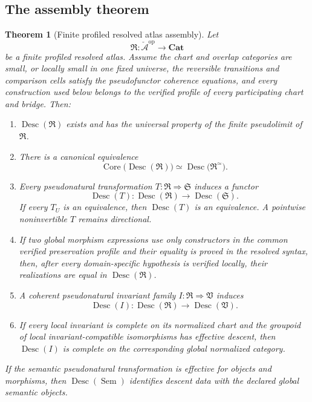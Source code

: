 \documentclass[11pt]{article}
\newtheorem{theorem}{Theorem}[section]
\theoremstyle{definition}
\theoremstyle{remark}
\DeclareMathOperator{\Desc}{Desc}
\DeclareMathOperator{\Core}{Core}
\DeclareMathOperator{\Sem}{Sem}
\newcommand{\Cat}{\mathbf{Cat}}
\begin{document}
\subsection{The assembly theorem}

\begin{theorem}[Finite profiled resolved atlas assembly]
\label{thm:atlas-assembly}
Let
\[
\mathfrak R:\check{\mathcal A}^{\mathrm{op}}\to\Cat
\]
be a finite profiled resolved atlas. Assume the chart and overlap categories are small, or locally small in one fixed universe, the reversible transitions and comparison cells satisfy the pseudofunctor coherence equations, and every construction used below belongs to the verified profile of every participating chart and bridge. Then:

\begin{enumerate}[label=\textup{(\roman*)}]
\item \(\Desc(\mathfrak R)\) exists and has the universal property of the finite pseudolimit of \(\mathfrak R\).
\item There is a canonical equivalence
\[
\Core\bigl(\Desc(\mathfrak R)\bigr)
\simeq
\Desc\bigl(\mathfrak R^{\simeq}\bigr).
\]
\item Every pseudonatural transformation \(T:\mathfrak R\Rightarrow\mathfrak S\) induces a functor
\[
\Desc(T):\Desc(\mathfrak R)\to\Desc(\mathfrak S).
\]
If every \(T_U\) is an equivalence, then \(\Desc(T)\) is an equivalence. A pointwise noninvertible \(T\) remains directional.
\item If two global morphism expressions use only constructors in the common verified preservation profile and their equality is proved in the resolved syntax, then, after every domain-specific hypothesis is verified locally, their realizations are equal in \(\Desc(\mathfrak R)\).
\item A coherent pseudonatural invariant family \(I:\mathfrak R\Rightarrow\mathfrak V\) induces
\[
\Desc(I):\Desc(\mathfrak R)\to\Desc(\mathfrak V).
\]
\item If every local invariant is complete on its normalized chart and the groupoid of local invariant-compatible isomorphisms has effective descent, then \(\Desc(I)\) is complete on the corresponding global normalized category.
\end{enumerate}

If the semantic pseudonatural transformation is effective for objects and morphisms, then \(\Desc(\Sem)\) identifies descent data with the declared global semantic objects.
\end{theorem}
\end{document}
